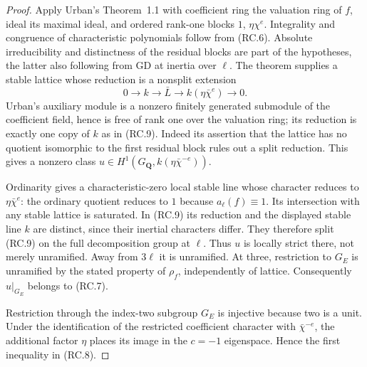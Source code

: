 \documentclass[11pt,a4paper]{article}
\theoremstyle{definition}
\begin{document}
\begin{proof}
Apply Urban's Theorem~1.1 with coefficient ring the
valuation ring of $f$, ideal its maximal ideal, and
ordered rank-one blocks $1$, $\eta\chi^e$.
Integrality and congruence of characteristic polynomials
follow from (RC.6).  Absolute irreducibility and
distinctness of the residual blocks are part of the
hypotheses, the latter also following from GD at
inertia over $\ell$.  The theorem supplies a stable
lattice whose reduction is a nonsplit extension
\[
 0\longrightarrow k\longrightarrow\bar L
       \longrightarrow k(\eta\bar\chi^e)
       \longrightarrow0.                                  \tag{RC.9}
\]
Urban's auxiliary module is a nonzero finitely generated
submodule of the coefficient field, hence is free of
rank one over the valuation ring; its reduction is
exactly one copy of $k$ as in (RC.9).
Indeed its assertion that the lattice has no quotient
isomorphic to the first residual block rules out a
split reduction.  This gives a nonzero class
$u\in H^1(G_{\mathbf Q},k(\eta\bar\chi^{-e}))$.

Ordinarity gives a characteristic-zero local stable
line whose character reduces to $\eta\bar\chi^e$:
the ordinary quotient reduces to $1$ because
$a_\ell(f)\equiv1$.  Its intersection with any stable
lattice is saturated.  In (RC.9) its reduction and the
displayed stable line $k$ are distinct, since their
inertial characters differ.  They therefore split
(RC.9) on the full decomposition group at $\ell$.
Thus $u$ is locally strict there, not merely
unramified.  Away from $3\ell$ it is unramified.
At three, restriction to $G_E$ is unramified by the
stated property of $\rho_f$, independently of lattice.
Consequently $u|_{G_E}$ belongs to (RC.7).

Restriction through the index-two subgroup $G_E$ is
injective because two is a unit.  Under the
identification of the restricted coefficient character
with $\bar\chi^{-e}$, the additional factor $\eta$
places its image in the $c=-1$ eigenspace.  Hence the
first inequality in (RC.8).


\end{proof}
\end{document}
